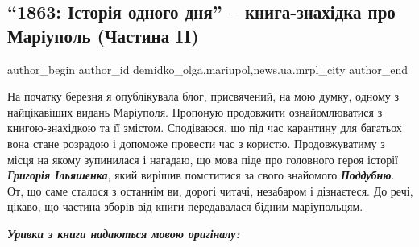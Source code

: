  
 
 
 
 
 
\subsection{\enquote{1863: Історія одного дня} – книга-знахідка про Маріуполь (Частина II)}
\label{sec:23_03_2020.stz.news.ua.mrpl_city.1.1863_istoria_odnogo_dnja_chastyna_2}
 
\ifcmt
 author_begin
   author_id demidko_olga.mariupol,news.ua.mrpl_city
 author_end
\fi

На початку березня я опублікувала блог, присвячений, на мою думку, одному з
найцікавіших видань Маріуполя. Пропоную продовжити ознайомлюватися з
книгою-знахідкою та її змістом. Сподіваюся, що під час карантину для багатьох
вона стане розрадою і допоможе провести час з користю. Продовжуватиму з місця
на якому зупинилася і нагадаю, що мова піде про головного героя історії
\emph{\textbf{Григорія Ільяшенка}}, який вирішив помститися за свого знайомого
\emph{\textbf{Поддубню}}. От, що саме сталося з останнім ви, дорогі читачі,
незабаром і дізнаєтеся. До речі, цікаво, що частина зборів від книги
передавалася бідним маріупольцям.

\emph{\textbf{Уривки з книги надаються мовою оригіналу:}}

